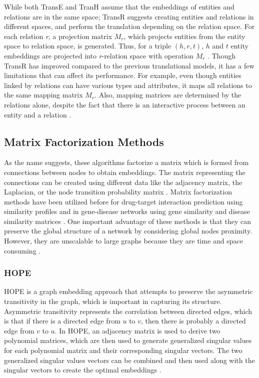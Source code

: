 While both TransE and TranH assume that the embeddings of entities and relations are in the same space; TransR suggests creating entities and relations in different spaces, and perform the translation depending on the relation space.
For each relation \textit{r}, a projection matrix $M_{r}$, which projects entities from the entity space to relation space, is generated.
Thus, for a triple $(h, r, t)$, $h$ and $t$ entity embeddings are projected into \textit{r}-relation space with operation $M_{r}$ \cite{lin_learning_2015}.
Though TransR has improved compared to the previous translational models, it has a few limitations that can affect its performance.
For example, even though entities linked by relations can have various types and attributes, it maps all relations to the same mapping matrix $M_{r}$.
Also, mapping matrices are determined by the relations alone, despite the fact that there is an interactive process between an entity and a relation \cite{ji_knowledge_2015}.

\subsection{Matrix Factorization Methods}

As the name suggests, these algorithms factorize a matrix which is formed from connections between nodes to obtain embeddings.
The matrix representing the connections can be created using different data like the adjacency matrix, the Laplacian, or the node transition probability matrix \cite{goyal_graph_2018}.
Matrix factorization methods have been utilized before for drug-target interaction prediction using similarity profiles \cite{ezzat_drug-target_2017, yamanishi_dinies:_2014} and in gene-disease networks using gene similarity and disease similarity matrices \cite{zeng_probability-based_2017}.
One important advantage of these methods is that they can preserve the global structure of a network by considering global nodes proximity.
However, they are unscalable to large graphs because they are time and space consuming \cite{cai_comprehensive_2017}.

\subsubsection{HOPE}

\ac{HOPE} is a graph embedding approach that attempts to preserve the asymmetric transitivity in the graph, which is important in capturing its structure.
Asymmetric transitivity represents the correlation between directed edges, which is that if there is a directed edge from $u$ to $v$, then there is probably a directed edge from $v$ to $u$.
In \ac{HOPE}, an adjacency matrix is used to derive two polynomial matrices, which are then used to generate generalized singular values for each polynomial matrix and their corresponding singular vectors.
The two generalized singular values vectors can be combined and then used along with the singular vectors to create the optimal embeddings \cite{ou_asymmetric_2016}.

